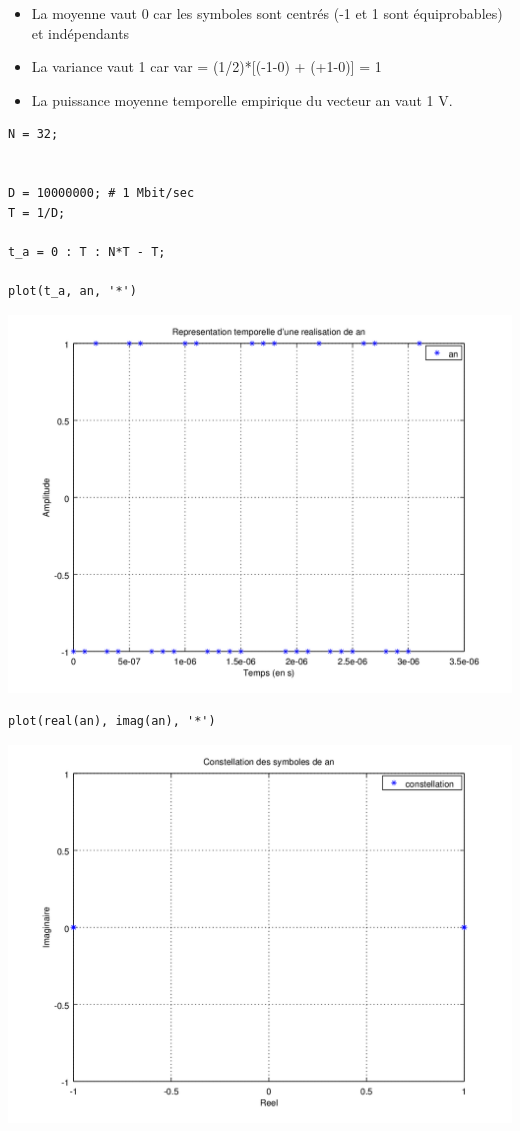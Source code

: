 \documentclass{acm_proc_article-sp}
\begin{document}
\begin{itemize}
\item La moyenne vaut 0 car les symboles sont centrés (-1 et 1 sont équiprobables) et indépendants
\item La variance vaut 1 car var = (1/2)*[(-1-0) + (+1-0)] = 1
\item La puissance moyenne temporelle empirique du vecteur an vaut 1 V.
\end{itemize}

\begin{center}
\begin{lstlisting}
N = 32;


D = 10000000; # 1 Mbit/sec
T = 1/D;

t_a = 0 : T : N*T - T;

plot(t_a, an, '*')
\end{lstlisting}

\includegraphics[scale=0.45]{ak_2.png}

\begin{lstlisting}
plot(real(an), imag(an), '*')
\end{lstlisting}

\includegraphics[scale=0.45]{constell_2.png}
\end{center}
\end{document}
